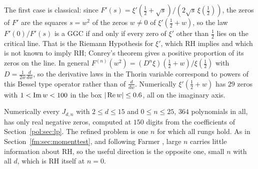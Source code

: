 The first case is classical: since $F'(s)=\xi'(\frac12+\sqrt s)/(2\sqrt s\,\xi(\frac12))$, the zeros of $F'$ are the squares $s=w^2$ of the zeros $w\ne0$ of $\xi'(\frac12+w)$, so the law $F'(0)/F'(s)$ is a GGC if and only if every zero of $\xi'$ other than $\frac12$ lies on the critical line. That is the Riemann Hypothesis for $\xi'$, which RH implies and which is not known to imply RH; Conrey's theorem \cite{Conrey83} gives a positive proportion of its zeros on the line. In general $F^{(n)}(w^2)=(D^n\xi)(\frac12+w)/\xi(\frac12)$ with $D=\frac{1}{2w}\frac{d}{dw}$, so the derivative laws in the Thorin variable correspond to powers of this Bessel type operator rather than of $\frac{d}{dw}$. Numerically $\xi'(\frac12+w)$ has $29$ zeros with $1<\operatorname{Im} w<100$ in the box $|\operatorname{Re} w|\le0.6$, all on the imaginary axis.

Numerically every $J_{d,n}$ with $2\le d\le15$ and $0\le n\le25$, $364$ polynomials in all, has only real negative zeros, computed at $150$ digits from the coefficients of Section~\ref{pol:sec:lp}. The refined problem is one $n$ for which all rungs hold. As in Section~\ref{fm:sec:momenttest}, and following Farmer \cite{Farmer22}, large $n$ carries little information about RH, so the useful direction is the opposite one, small $n$ with all $d$, which is RH itself at $n=0$.
